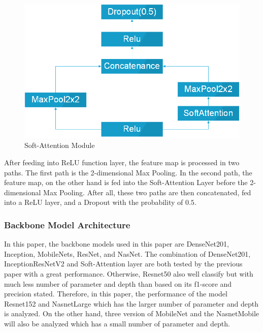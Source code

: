 \documentclass[sensors,article,submit,pdftex,moreauthors]{Definitions/mdpi}
\begin{document}
\begin{figure}[H]
	\centering
	\includegraphics[width=0.5\linewidth]{Definitions/SoftAttentionBlock}
	\caption{Soft-Attention Module}
	\label{fig:soft-attention-block}
\end{figure}

After feeding into ReLU function layer, the feature map is processed in two paths. The first path is the 2-dimensional Max Pooling. In the second path, the feature map, on the other hand is fed into the Soft-Attention Layer before the 2-dimensional Max Pooling. After all, these two paths are then concatenated, fed into a ReLU layer, and a Dropout with the probability of $0.5$.
\subsubsection{Backbone Model Architecture}
In this paper, the backbone models used in this paper are DenseNet201\cite{06993}, Inception\cite{00567}, MobileNets\cite{04861}\cite{04381}\cite{02244}, ResNet\cite{03385}\cite{05027}, and NasNet\cite{07012}. The combination of DenseNet201, InceptionResNetV2 and Soft-Attention layer are both tested by the previous paper\cite{03358} with a great performance. Otherwise, Resnet50 also well classify but with much less number of parameter and depth than based on its f1-score and precision stated. Therefore, in this paper, the performance of the model Resnet152 and NasnetLarge which has the larger number of parameter and depth is analyzed. On the other hand, three version of MobileNet and the NasnetMobile will also be analyzed which has a small number of parameter and depth.  
\end{document}
